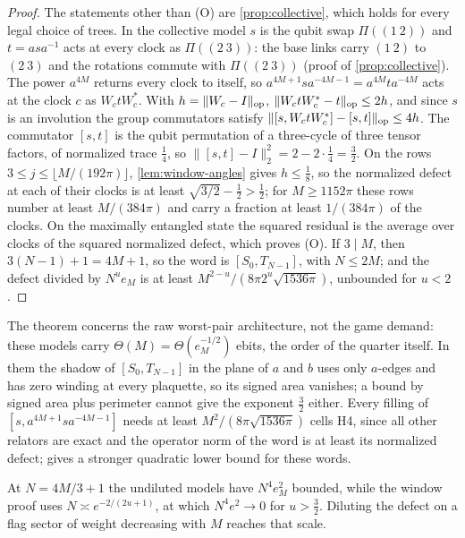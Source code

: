 \begin{proof}
The statements other than (O) are \cref{prop:collective}, which holds for every legal choice of trees. In the collective model $s$ is the
qubit swap $\Pi((1\ 2))$ and $t=asa^{-1}$ acts at every clock as $\Pi((2\ 3))$: the base links carry $(1\ 2)$ to $(2\ 3)$ and the rotations
commute with $\Pi((2\ 3))$ (proof of \cref{prop:collective}). The power $a^{4M}$ returns every clock to itself, so $a^{4M+1}sa^{-4M-1}=a^{4M}ta^{-4M}$
acts at the clock $c$ as $W_ctW_c^*$. With $h=\lVert W_c-I\rVert_{\mathrm{op}}$, $\lVert W_ctW_c^*-t\rVert_{\mathrm{op}}\le2h$, and since $s$ is an involution the group commutators
satisfy $\lVert [s,W_ctW_c^*]-[s,t]\rVert_{\mathrm{op}}\le4h$. The commutator $[s,t]$ is the qubit permutation of a three-cycle of three tensor factors, of normalized
trace $\frac14$, so $\|[s,t]-I\|_2^2=2-2\cdot\frac14=\frac32$. On the rows $3\le j\le\lfloor M/(192\pi)\rfloor$, \cref{lem:window-angles} gives $h\le\frac18$, so the
normalized defect at each of their clocks is at least $\sqrt{3/2}-\frac12>\frac12$; for $M\ge1152\pi$ these rows number at least
$M/(384\pi)$ and carry a fraction at least $1/(384\pi)$ of the clocks. On the maximally entangled state the squared residual is the
average over clocks of the squared normalized defect, which proves (O). If $3\mid M$, then $3(N-1)+1=4M+1$, so the word is
$[S_0,T_{N-1}]$, with $N\le2M$; and the defect divided by $N^ue_M$ is at least $M^{2-u}/(8\pi2^u\sqrt{1536\pi})$, unbounded for $u<2$.
\end{proof}

The theorem concerns the raw worst-pair architecture, not the game demand: these models carry $\Theta(M)=\Theta(e_M^{-1/2})$ ebits, the
order of the quarter itself. In them the shadow of $[S_0,T_{N-1}]$ in the plane of $a$ and $b$ uses only $a$-edges and has zero winding
at every plaquette, so its signed area vanishes; a bound by signed area plus perimeter cannot give the exponent $\frac32$ either. Every
filling of $[s,a^{4M+1}sa^{-4M-1}]$ needs at least $M^2/(8\pi\sqrt{1536\pi})$ cells H4, since all other relators are exact and the operator
norm of the word is at least its normalized defect; \cite[Proposition~3.4]{DM-H3} gives a stronger quadratic lower bound for these words.

At $N=4M/3+1$ the undiluted models have $N^4e_M^2$ bounded, while the window proof uses $N\asymp e^{-2/(2u+1)}$, at which $N^4e^2\to0$ for
$u>\frac32$. Diluting the defect on a flag sector of weight decreasing with $M$ reaches that scale.

